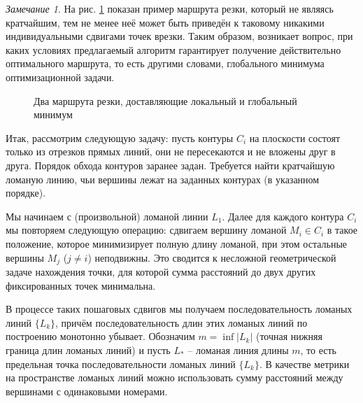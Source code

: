 \documentclass[14pt]{extarticle}
\theoremstyle{plain}%
\theoremstyle{remark}
\newtheorem{remark}{Замечание}
\begin{document}
\begin{remark}
  На рис. \ref{counter-example}
  показан пример маршрута резки,
  который не являясь кратчайшим,
  тем не менее неё
  может быть приведён к таковому
  никакими индивидуальными сдвигами
  точек врезки.
  Таким образом, возникает вопрос,
  при каких условиях предлагаемый алгоритм
  гарантирует получение действительно
  оптимального маршрута,
  то есть другими словами,
  глобального минимума оптимизационной задачи.
\end{remark}

\begin{figure}
  \begin{center}
  \end{center}
  \caption{Два маршрута резки, доставляющие локальный и глобальный минимум}
  \label{counter-example}
\end{figure}

Итак,
рассмотрим следующую задачу:
пусть контуры
$C_i$
на плоскости состоят
только из отрезков прямых линий,
они не пересекаются и не вложены друг в друга.
Порядок обхода контуров
заранее задан.
Требуется найти кратчайшую ломаную линию,
чьи вершины лежат на заданных контурах
(в указанном порядке).

Мы начинаем с
(произвольной)
ломаной линии
$L_1$.
Далее для каждого контура
$C_i$
мы повторяем следующую операцию:
сдвигаем вершину ломаной
$M_i \in C_i$
в такое положение,
которое минимизирует полную
длину ломаной,
при этом остальные вершины
$M_j$
($j \ne i$)
неподвижны.
Это сводится к несложной геометрической
задаче нахождения точки,
для которой сумма расстояний
до двух других фиксированных точек
минимальна.

В процессе таких пошаговых сдвигов
мы получаем последовательность
ломаных линий
$\{L_k\}$,
причём последовательность
длин этих ломаных линий
по построению монотонно убывает.
Обозначим
$m = \inf |L_k|$
(точная нижняя граница длин ломаных линий)
и пусть
$L_*$  --
ломаная линия длины
$m$,
то есть предельная точка
последовательности ломаных линий
$\{L_k\}$.
В качестве метрики на пространстве ломаных линий
можно использовать сумму расстояний между
вершинами с одинаковыми номерами.
\end{document}
